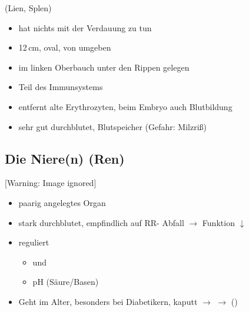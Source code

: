 (Lien, Splen)





\begin{itemize}
\item hat nichts  mit der Verdauung  zu tun 
\item 12\,cm, oval, von  umgeben
\item im linken Oberbauch unter den Rippen gelegen
\item Teil des Immunsystems
\item entfernt alte Erythrozyten, beim Embryo auch Blut\-bildung
\item sehr gut durchblutet, Blutspeicher (Gefahr:
Milzri{\ss})
\end{itemize}




\subsection{Die Niere(n) (Ren)}
\begin{center}
 [Warning: Image ignored] %

\end{center}
\begin{itemize}
    \item paarig angelegtes Organ
    \item stark durchblutet, empfindlich auf RR- Abfall ${\rightarrow}$
    Funktion ${\downarrow}$
    \item reguliert
    \begin{itemize}
        \item {} und 
        \item pH (S\"aure/Basen)
    \end{itemize}
    \item Geht im Alter, besonders bei Diabetikern, kaputt ${\rightarrow}$
    {\quotedblbase} ${\rightarrow}$
    {\quotedblbase}
    ()
\end{itemize}

